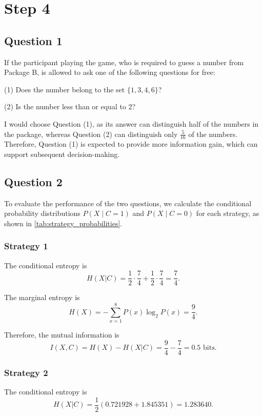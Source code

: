 \documentclass[10pt,a4paper]{article}
\begin{document}
		\section{Step 4}
		
		\subsection{Question 1}
		If the participant playing the game, who is required to guess a number from Package B, is allowed to ask one of the following questions for free:
		
		(1) Does the number belong to the set $\{1,3,4,6\}$?
		
		(2) Is the number less than or equal to 2?
		
		I would choose Question (1), as its answer can distinguish half of the numbers in the package, whereas Question (2) can distinguish only $\frac{5}{16}$ of the numbers. Therefore, Question (1) is expected to provide more information gain, which can support subsequent decision-making.
		
		\subsection{Question 2}
		To evaluate the performance of the two questions, we calculate the conditional probability distributions $P(X\mid C=1)$ and $P(X\mid C=0)$ for each strategy, as shown in \cref{tab:strategy_probabilities}.
		
		\subsubsection{Strategy 1}
		
		The conditional entropy is
		\[
		H(X|C)=\frac{1}{2}\cdot\frac{7}{4}
		+\frac{1}{2}\cdot\frac{7}{4}
		=\frac{7}{4}.
		\]
		
		The marginal entropy is
		\[
		H(X)=-\sum_{x=1}^{8}P(x)\log_2P(x)
		=\frac{9}{4}.
		\]
		
		Therefore, the mutual information is
		\[
		I(X,C)=H(X)-H(X|C)
		=\frac{9}{4}-\frac{7}{4}
		=\boxed{0.5\text{ bits}}.
		\]
		
		\subsubsection{Strategy 2}
		
		The conditional entropy is
		\[
		H(X|C)=\frac{1}{2}(0.721928+1.845351)
		=1.283640.
		\]
		
\end{document}
